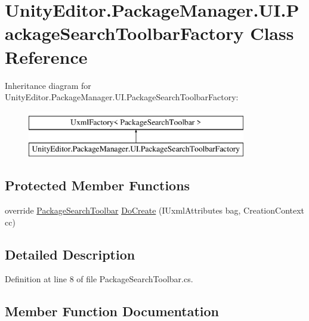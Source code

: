 \hypertarget{class_unity_editor_1_1_package_manager_1_1_u_i_1_1_package_search_toolbar_factory}{}\section{Unity\+Editor.\+Package\+Manager.\+U\+I.\+Package\+Search\+Toolbar\+Factory Class Reference}
\label{class_unity_editor_1_1_package_manager_1_1_u_i_1_1_package_search_toolbar_factory}
Inheritance diagram for Unity\+Editor.\+Package\+Manager.\+U\+I.\+Package\+Search\+Toolbar\+Factory\+:\begin{figure}[H]
\begin{center}
\leavevmode
\includegraphics[height=2.000000cm]{class_unity_editor_1_1_package_manager_1_1_u_i_1_1_package_search_toolbar_factory}
\end{center}
\end{figure}
\subsection*{Protected Member Functions}
\begin{DoxyCompactItemize}
\item 
override \mbox{\hyperlink{class_unity_editor_1_1_package_manager_1_1_u_i_1_1_package_search_toolbar}{Package\+Search\+Toolbar}} \mbox{\hyperlink{class_unity_editor_1_1_package_manager_1_1_u_i_1_1_package_search_toolbar_factory_abc23a45600854ad667016ad205245e8c}{Do\+Create}} (I\+Uxml\+Attributes bag, Creation\+Context cc)
\end{DoxyCompactItemize}


\subsection{Detailed Description}


Definition at line 8 of file Package\+Search\+Toolbar.\+cs.



\subsection{Member Function Documentation}
\mbox{\label{class_unity_editor_1_1_package_manager_1_1_u_i_1_1_package_search_toolbar_factory_abc23a45600854ad667016ad205245e8c}} 
